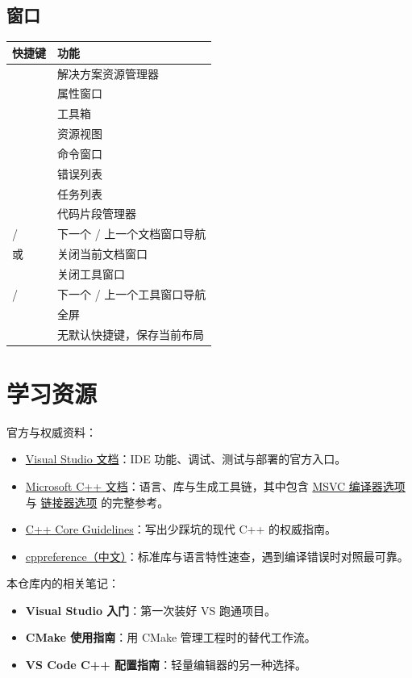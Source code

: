 \subsection{窗口}
\begin{longtable}{L{4.6cm}L{10.2cm}}
\toprule
\textbf{快捷键} & \textbf{功能} \\ \midrule
\endhead \bottomrule \endlastfoot
{} & 解决方案资源管理器 \\
 & 属性窗口 \\
 & 工具箱 \\
 & 资源视图 \\
 & 命令窗口 \\
 & 错误列表 \\
 & 任务列表 \\
 & 代码片段管理器 \\
 /  & 下一个 / 上一个文档窗口导航 \\
 或  & 关闭当前文档窗口 \\
 & 关闭工具窗口 \\
 /  & 下一个 / 上一个工具窗口导航 \\
 & 全屏 \\
 & 无默认快捷键，保存当前布局 \\
\end{longtable}
\section{学习资源}
官方与权威资料：
\begin{itemize}
  \item \href{https://learn.microsoft.com/visualstudio/windows/}{Visual Studio 文档}：IDE 功能、调试、测试与部署的官方入口。
  \item \href{https://learn.microsoft.com/cpp/}{Microsoft C++ 文档}：语言、库与生成工具链，其中包含 \href{https://learn.microsoft.com/cpp/build/reference/compiler-options}{MSVC 编译器选项} 与 \href{https://learn.microsoft.com/cpp/build/reference/linker-options}{链接器选项} 的完整参考。
  \item \href{https://isocpp.github.io/CppCoreGuidelines/CppCoreGuidelines}{C++ Core Guidelines}：写出少踩坑的现代 C++ 的权威指南。
  \item \href{https://zh.cppreference.com/}{cppreference（中文）}：标准库与语言特性速查，遇到编译错误时对照最可靠。
\end{itemize}
本仓库内的相关笔记：
\begin{itemize}
  \item \textbf{Visual Studio 入门}：第一次装好 VS 跑通项目。
  \item \textbf{CMake 使用指南}：用 CMake 管理工程时的替代工作流。
  \item \textbf{VS Code C++ 配置指南}：轻量编辑器的另一种选择。
\end{itemize}
